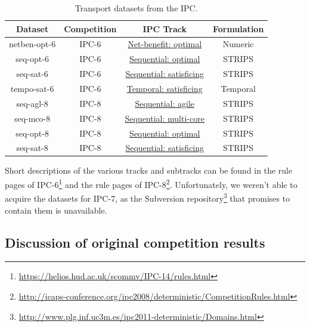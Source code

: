 \begin{table}[tb]
\begin{tabular}{c||ccc}
\textbf{Dataset} & \textbf{Competition} & \textbf{IPC Track} & \textbf{Formulation} \\ 
\hline
\hline
netben-opt-6 & IPC-6 & \href{http://icaps-conference.org/ipc2008/deterministic/NetBenefitOptimization.html}{Net-benefit: optimal} & Numeric \\ 
seq-opt-6 & IPC-6 & \href{http://icaps-conference.org/ipc2008/deterministic/SequentialOptimization.html}{Sequential: optimal} & STRIPS \\ 
seq-sat-6 & IPC-6 & \href{http://icaps-conference.org/ipc2008/deterministic/SequentialSatisficing.html}{Sequential: satisficing} & STRIPS \\ 
tempo-sat-6 & IPC-6 & \href{http://icaps-conference.org/ipc2008/deterministic/TemporalSatisficing.html}{Temporal: satisficing} & Temporal \\ 
\hline
seq-agl-8 & IPC-8 & \href{https://helios.hud.ac.uk/scommv/IPC-14/seqagi.html}{Sequential: agile} & STRIPS \\ 
seq-mco-8 & IPC-8 & \href{https://helios.hud.ac.uk/scommv/IPC-14/seqmulti.html}{Sequential: multi-core} & STRIPS \\ 
seq-opt-8 & IPC-8 & \href{https://helios.hud.ac.uk/scommv/IPC-14/seqopt.html}{Sequential: optimal} & STRIPS \\ 
seq-sat-8 & IPC-8 & \href{https://helios.hud.ac.uk/scommv/IPC-14/seqsat.html}{Sequential: satisficing} & STRIPS \\ 
\end{tabular}
\caption{Transport datasets from the IPC.}
\label{tab:ipc-datasets}
\end{table}

Short descriptions of the various tracks and subtracks can be found in the rule pages of IPC-6\footnote{\url{https://helios.hud.ac.uk/scommv/IPC-14/rules.html}}
and the rule pages of IPC-8\footnote{\url{http://icaps-conference.org/ipc2008/deterministic/CompetitionRules.html}}.
Unfortunately, we weren't able to acquire the datasets for IPC-7, as the Subversion repository\footnote{\url{http://www.plg.inf.uc3m.es/ipc2011-deterministic/Domains.html}} that promises to contain them is unavailable.

\subsection{Discussion of original competition results}

